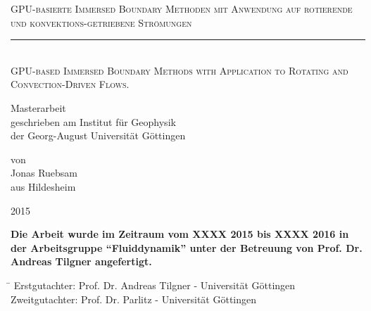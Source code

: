 \documentclass[11pt,a4paper,headsepline,bibliography=totoc,idxtotoc,DIV12,openright,twoside=true,chapterprefix=on]{scrbook}
\begin{document}
\makeatletter
\renewcommand*\env@cases[1][1.2]{%
  \let\@ifnextchar\new@ifnextchar
  \left\lbrace
  \def\arraystretch{#1}%
  \array{@{}l@{\quad}l@{}}%
}
\makeatother

\begin{titlepage}
       \begin{center}
       \begin{huge}
       \textsc{GPU-basierte Immersed Boundary Methoden mit Anwendung auf rotierende und konvektions-getriebene Strömungen}
       \rule{0.9\textwidth}{0.4pt}\\
       \textsc{GPU-based Immersed Boundary Methods with Application to Rotating and Convection-Driven Flows.}\\[1.8cm]
       \end{huge}
       \begin{large}
	Masterarbeit\\[2cm]
	geschrieben am Institut für Geophysik\\
	der Georg-August Universität Göttingen\\[2cm]
       \end{large}
       \begin{large}
       von\\[.5cm]
       Jonas Ruebsam\\
       aus Hildesheim\\
       \vfill
       \begin{center}
       2015
       \end{center}
       \end{large}
     \end{center}
\end{titlepage}

\mbox{}
\thispagestyle{empty}
\newpage
\newpage
{}
\thispagestyle{empty}
\vfill
\noindent \textbf{Die Arbeit wurde im Zeitraum vom XXXX 2015 bis XXXX 2016 in der Arbeitsgruppe "`Fluiddynamik"'
 unter der Betreuung von Prof. Dr. Andreas Tilgner angefertigt. }\\

\vfill
\begin{tabbing}
  \hspace{3cm}\=\kill
   Erstgutachter: \quad  Prof. Dr. Andreas Tilgner - Universität Göttingen\\
   Zweitgutachter: \quad  Prof. Dr. Parlitz - Universität Göttingen\\
\end{tabbing}
\end{document}
